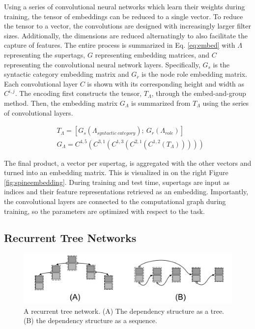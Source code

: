 \documentclass[11pt]{article}
\begin{document}
Using a series of convolutional neural networks which learn their weights during training, the tensor of embeddings can be reduced to a single vector.
%
To reduce the tensor to a vector, the convolutions are designed with increasingly larger filter sizes.
%
Additionally, the dimensions are reduced alternatingly to also facilitate the capture of features.
%
The entire process is summarized in Eq. \ref{eq:embed} with $\Lambda$ representing the supertags, $G$ representing embedding matrices, and
$C$ representing the convolutional neural network layers.
%
Specifically, $G_s$ is the syntactic category embedding matrix and
$G_r$ is the node role embedding matrix.
%
Each convolutional layer $C$ is shown with its corresponding height and width as $C^{i,j}$.
%
The encoding first constructs the tensor, $T_\Lambda$, through the embed-and-group method.
%
Then, the embedding matrix $G_\Lambda$ is summarized from $T_\Lambda$ using the
series of convolutional layers.

\begin{align}
& T_\Lambda = [G_s(\Lambda_{syntactic~category});~G_r(\Lambda_{role})] \nonumber \\
& G_\Lambda = C^{4,5}(C^{3,1}(C^{1,3}(C^{2,1}(C^{1,2}(T_\Lambda))))) \label{eq:embed}
\end{align}



The final product, a vector per supertag, is aggregated with the other vectors
and turned into an embedding matrix.
%
This is visualized in on the right Figure \ref{fig:spineembedding}.
%
During training and test time, supertags are input as indices and their feature
representations retrieved as an embedding.
%
Importantly, the convolutional layers are connected to the computational graph during training, so the parameters are optimized with respect to the task.


\subsection{Recurrent Tree Networks}
\label{subsec:rtn}

\begin{figure}[tH!]
\centering
\includegraphics[width=\textwidth]{rtn.pdf}
\caption{A recurrent tree network. (A) The dependency structure as a tree.  (B) the dependency structure as a sequence.}
 \label{fig:rtn}
\end{figure}
\end{document}
